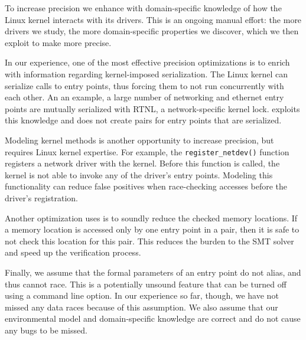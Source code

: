 {To increase precision we enhance \whoop with domain-specific knowledge of how the Linux kernel interacts with its drivers. This is an ongoing manual effort: the more drivers we study, the more domain-specific properties we discover, which we then exploit to make \whoop more precise.

In our experience, one of the most effective precision optimizations is to enrich \whoop with information regarding kernel-imposed serialization. The Linux kernel can serialize calls to entry points, thus forcing them to not run concurrently with each other. An an example, a large number of networking and ethernet entry points are mutually serialized with RTNL, a network-specific kernel lock. \whoop exploits this knowledge and does not create pairs for entry points that are serialized.

Modeling kernel methods is another opportunity to increase precision, but requires Linux kernel expertise. For example, the \texttt{register\_netdev()} function registers a network driver with the kernel. Before this function is called, the kernel is not able to invoke any of the driver's entry points. Modeling this functionality can reduce false positives when race-checking accesses before the driver's registration.

Another optimization \whoop uses is to soundly reduce the checked memory locations. If a memory location is accessed only by one entry point in a pair, then it is safe to not check this location for this pair. This reduces the burden to the SMT solver and speed up the verification process.


Finally, we assume that the formal parameters of an entry point do not alias, and thus cannot race. This is a potentially unsound feature that can be turned off using a command line option. In our experience so far, though, we have not missed any data races because of this assumption. We also assume that our environmental model and domain-specific knowledge are correct and do not cause any bugs to be missed.

}
